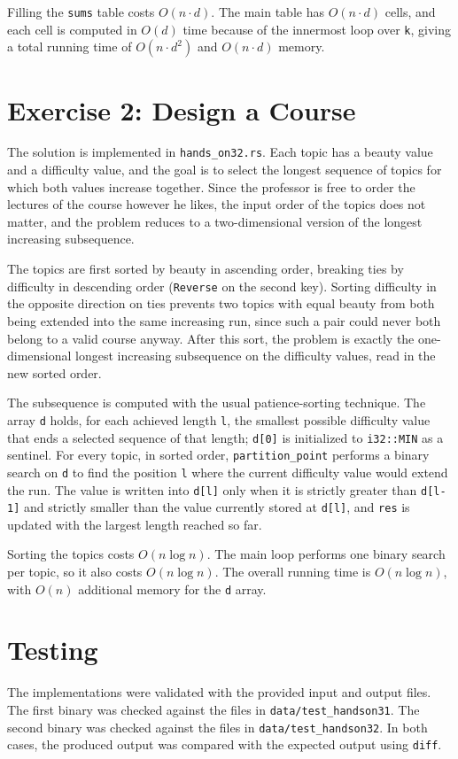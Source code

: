 \documentclass[11pt,a4paper]{article}
\begin{document}
Filling the \texttt{sums} table costs \(O(n \cdot d)\). The main table has
\(O(n \cdot d)\) cells, and each cell is computed in \(O(d)\) time because of
the innermost loop over \texttt{k}, giving a total running time of
\(O(n \cdot d^2)\) and \(O(n \cdot d)\) memory.

\section*{Exercise 2: Design a Course}
The solution is implemented in \texttt{hands\_on32.rs}. Each topic has a
beauty value and a difficulty value, and the goal is to select the longest
sequence of topics for which both values increase together. Since the
professor is free to order the lectures of the course however he likes, the
input order of the topics does not matter, and the problem reduces to a
two-dimensional version of the longest increasing subsequence.

The topics are first sorted by beauty in ascending order, breaking ties by
difficulty in descending order (\texttt{Reverse} on the second key). Sorting
difficulty in the opposite direction on ties prevents two topics with equal
beauty from both being extended into the same increasing run, since such a
pair could never both belong to a valid course anyway. After this sort, the
problem is exactly the one-dimensional longest increasing subsequence on the
difficulty values, read in the new sorted order.

The subsequence is computed with the usual patience-sorting technique. The
array \texttt{d} holds, for each achieved length \texttt{l}, the smallest
possible difficulty value that ends a selected sequence of that length;
\texttt{d[0]} is initialized to \texttt{i32::MIN} as a sentinel. For every
topic, in sorted order, \texttt{partition\_point} performs a binary search on
\texttt{d} to find the position \texttt{l} where the current difficulty value
would extend the run. The value is written into \texttt{d[l]} only when it is
strictly greater than \texttt{d[l-1]} and strictly smaller than the value
currently stored at \texttt{d[l]}, and \texttt{res} is updated with the
largest length reached so far.

Sorting the topics costs \(O(n \log n)\). The main loop performs one binary
search per topic, so it also costs \(O(n \log n)\). The overall running time
is \(O(n \log n)\), with \(O(n)\) additional memory for the \texttt{d} array.

\section*{Testing}
The implementations were validated with the provided input and output files.
The first binary was checked against the files in
\texttt{data/test\_handson31}. The second binary was checked against the
files in \texttt{data/test\_handson32}. In both cases, the produced output
was compared with the expected output using \texttt{diff}.
\end{document}

